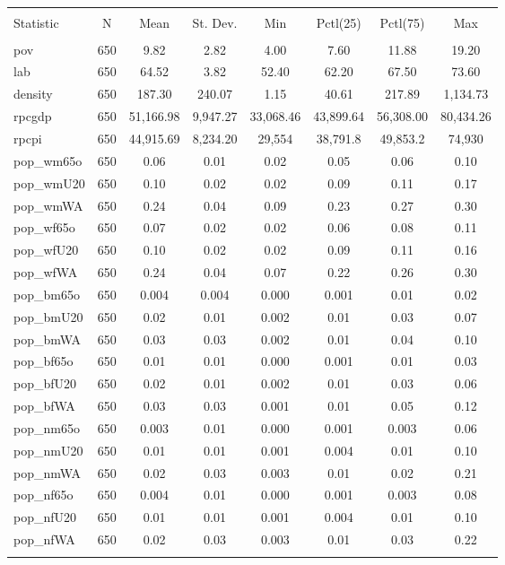 
\begin{table}[!htbp] \centering 
  \caption{} 
  \label{tab:data_summary} 
\begin{tabular}{@{\extracolsep{5pt}}lccccccc} 
\\[-1.8ex]\hline 
\hline \\[-1.8ex] 
Statistic & \multicolumn{1}{c}{N} & \multicolumn{1}{c}{Mean} & \multicolumn{1}{c}{St. Dev.} & \multicolumn{1}{c}{Min} & \multicolumn{1}{c}{Pctl(25)} & \multicolumn{1}{c}{Pctl(75)} & \multicolumn{1}{c}{Max} \\ 
\hline \\[-1.8ex] 
pov & 650 & 9.82 & 2.82 & 4.00 & 7.60 & 11.88 & 19.20 \\ 
lab & 650 & 64.52 & 3.82 & 52.40 & 62.20 & 67.50 & 73.60 \\ 
density & 650 & 187.30 & 240.07 & 1.15 & 40.61 & 217.89 & 1,134.73 \\ 
rpcgdp & 650 & 51,166.98 & 9,947.27 & 33,068.46 & 43,899.64 & 56,308.00 & 80,434.26 \\ 
rpcpi & 650 & 44,915.69 & 8,234.20 & 29,554 & 38,791.8 & 49,853.2 & 74,930 \\ 
pop\_wm65o & 650 & 0.06 & 0.01 & 0.02 & 0.05 & 0.06 & 0.10 \\ 
pop\_wmU20 & 650 & 0.10 & 0.02 & 0.02 & 0.09 & 0.11 & 0.17 \\ 
pop\_wmWA & 650 & 0.24 & 0.04 & 0.09 & 0.23 & 0.27 & 0.30 \\ 
pop\_wf65o & 650 & 0.07 & 0.02 & 0.02 & 0.06 & 0.08 & 0.11 \\ 
pop\_wfU20 & 650 & 0.10 & 0.02 & 0.02 & 0.09 & 0.11 & 0.16 \\ 
pop\_wfWA & 650 & 0.24 & 0.04 & 0.07 & 0.22 & 0.26 & 0.30 \\ 
pop\_bm65o & 650 & 0.004 & 0.004 & 0.000 & 0.001 & 0.01 & 0.02 \\ 
pop\_bmU20 & 650 & 0.02 & 0.01 & 0.002 & 0.01 & 0.03 & 0.07 \\ 
pop\_bmWA & 650 & 0.03 & 0.03 & 0.002 & 0.01 & 0.04 & 0.10 \\ 
pop\_bf65o & 650 & 0.01 & 0.01 & 0.000 & 0.001 & 0.01 & 0.03 \\ 
pop\_bfU20 & 650 & 0.02 & 0.01 & 0.002 & 0.01 & 0.03 & 0.06 \\ 
pop\_bfWA & 650 & 0.03 & 0.03 & 0.001 & 0.01 & 0.05 & 0.12 \\ 
pop\_nm65o & 650 & 0.003 & 0.01 & 0.000 & 0.001 & 0.003 & 0.06 \\ 
pop\_nmU20 & 650 & 0.01 & 0.01 & 0.001 & 0.004 & 0.01 & 0.10 \\ 
pop\_nmWA & 650 & 0.02 & 0.03 & 0.003 & 0.01 & 0.02 & 0.21 \\ 
pop\_nf65o & 650 & 0.004 & 0.01 & 0.000 & 0.001 & 0.003 & 0.08 \\ 
pop\_nfU20 & 650 & 0.01 & 0.01 & 0.001 & 0.004 & 0.01 & 0.10 \\ 
pop\_nfWA & 650 & 0.02 & 0.03 & 0.003 & 0.01 & 0.03 & 0.22 \\ 
\hline \\[-1.8ex] 
\end{tabular} 
\end{table} 
